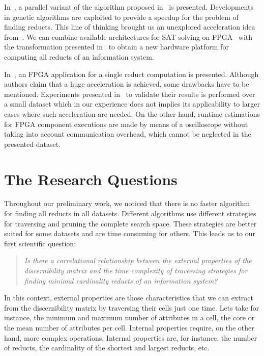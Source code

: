 \documentclass[11pt,authoryear]{elsarticle}
\begin{document}
  In~\cite{Wroblewski98}, a parallel variant of the algorithm proposed in~\cite{Wroblewski95} is presented.
  Developments in genetic algorithms are exploited to provide a speedup for the problem of finding reducts.
  This line of thinking brought us an unexplored acceleration idea from~\cite{Jensen14}. We can combine 
  available architectures for SAT solving on FPGA~\cite{Safar07,Kanazawa11} with the transformation
  presented in~\cite{Jensen14} to obtain a new hardware platform for computing all reducts of an information 
  system.
  
  In~\cite{Grzes13,Kopczynski14}, an FPGA application for a single reduct computation is presented. Although
  authors claim that a huge acceleration is achieved, some drawbacks have to be mentioned. Experiments presented 
  in~\cite{Kopczynski14} to validate their results is performed over a small dataset which in our experience 
  does not implies its applicability to larger cases where such acceleration are needed. On the other hand, 
  runtime estimations for FPGA component executions are made by means of a oscilloscope without taking into 
  account communication overhead, which cannot be neglected in the presented dataset.

\section{The Research Questions}\label{ResearchQuestions} 
  Throughout our preliminary work, we noticed that there is no faster algorithm for finding all reducts in 
  all datasets. Different algorithms use different strategies for traversing and pruning the complete search 
  space. These strategies are better suited for some datasets and are time consuming for others. This leads 
  us to our first scientific question:
  
\begin{quote}
  \emph{Is there a correlational relationship between the external properties of the discernibility matrix and the time 
  		complexity of traversing strategies for finding minimal cardinality reducts of an information
  		system?}
\end{quote}
  		
  In this context, external properties are those characteristics that we can extract from the discernibility
  matrix by traversing their cells just one time. Lets take for instance, the minimum and maximum number of
  attributes in a cell, the core or the mean number of attributes per cell. Internal properties require, on 
  the other hand, more complex operations. Internal properties are, for instance, the number of reducts, the
  cardinality of the shortest and largest reducts, etc.
  
\end{document}
